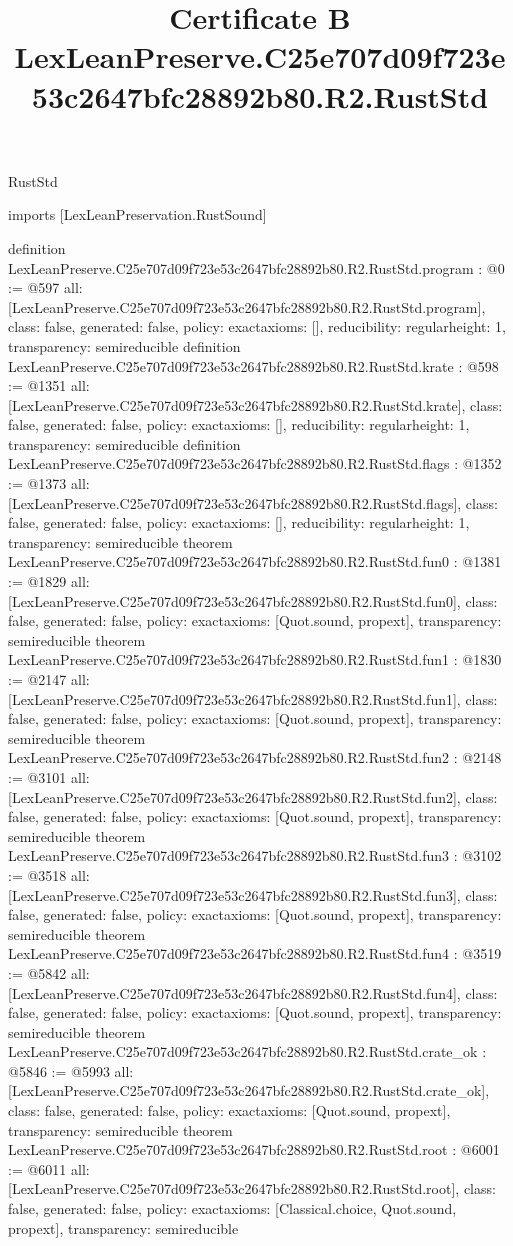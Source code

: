 \begin{lexlean}{RustStd}
\title{Certificate B LexLeanPreserve.C25e707d09f723e53c2647bfc28892b80.R2.RustStd}
\begin{coremodule}
imports [LexLeanPreservation.RustSound]

definition LexLeanPreserve.C25e707d09f723e53c2647bfc28892b80.R2.RustStd.program : @0 := @597 {
  all: [LexLeanPreserve.C25e707d09f723e53c2647bfc28892b80.R2.RustStd.program],
  class: false,
  generated: false,
  policy: exact{axioms: []},
  reducibility: regular{height: 1},
  transparency: semireducible
}
definition LexLeanPreserve.C25e707d09f723e53c2647bfc28892b80.R2.RustStd.krate : @598 := @1351 {
  all: [LexLeanPreserve.C25e707d09f723e53c2647bfc28892b80.R2.RustStd.krate],
  class: false,
  generated: false,
  policy: exact{axioms: []},
  reducibility: regular{height: 1},
  transparency: semireducible
}
definition LexLeanPreserve.C25e707d09f723e53c2647bfc28892b80.R2.RustStd.flags : @1352 := @1373 {
  all: [LexLeanPreserve.C25e707d09f723e53c2647bfc28892b80.R2.RustStd.flags],
  class: false,
  generated: false,
  policy: exact{axioms: []},
  reducibility: regular{height: 1},
  transparency: semireducible
}
theorem LexLeanPreserve.C25e707d09f723e53c2647bfc28892b80.R2.RustStd.fun0 : @1381 := @1829 {
  all: [LexLeanPreserve.C25e707d09f723e53c2647bfc28892b80.R2.RustStd.fun0],
  class: false,
  generated: false,
  policy: exact{axioms: [Quot.sound, propext]},
  transparency: semireducible
}
theorem LexLeanPreserve.C25e707d09f723e53c2647bfc28892b80.R2.RustStd.fun1 : @1830 := @2147 {
  all: [LexLeanPreserve.C25e707d09f723e53c2647bfc28892b80.R2.RustStd.fun1],
  class: false,
  generated: false,
  policy: exact{axioms: [Quot.sound, propext]},
  transparency: semireducible
}
theorem LexLeanPreserve.C25e707d09f723e53c2647bfc28892b80.R2.RustStd.fun2 : @2148 := @3101 {
  all: [LexLeanPreserve.C25e707d09f723e53c2647bfc28892b80.R2.RustStd.fun2],
  class: false,
  generated: false,
  policy: exact{axioms: [Quot.sound, propext]},
  transparency: semireducible
}
theorem LexLeanPreserve.C25e707d09f723e53c2647bfc28892b80.R2.RustStd.fun3 : @3102 := @3518 {
  all: [LexLeanPreserve.C25e707d09f723e53c2647bfc28892b80.R2.RustStd.fun3],
  class: false,
  generated: false,
  policy: exact{axioms: [Quot.sound, propext]},
  transparency: semireducible
}
theorem LexLeanPreserve.C25e707d09f723e53c2647bfc28892b80.R2.RustStd.fun4 : @3519 := @5842 {
  all: [LexLeanPreserve.C25e707d09f723e53c2647bfc28892b80.R2.RustStd.fun4],
  class: false,
  generated: false,
  policy: exact{axioms: [Quot.sound, propext]},
  transparency: semireducible
}
theorem LexLeanPreserve.C25e707d09f723e53c2647bfc28892b80.R2.RustStd.crate_ok : @5846 := @5993 {
  all: [LexLeanPreserve.C25e707d09f723e53c2647bfc28892b80.R2.RustStd.crate_ok],
  class: false,
  generated: false,
  policy: exact{axioms: [Quot.sound, propext]},
  transparency: semireducible
}
theorem LexLeanPreserve.C25e707d09f723e53c2647bfc28892b80.R2.RustStd.root : @6001 := @6011 {
  all: [LexLeanPreserve.C25e707d09f723e53c2647bfc28892b80.R2.RustStd.root],
  class: false,
  generated: false,
  policy: exact{axioms: [Classical.choice, Quot.sound, propext]},
  transparency: semireducible
}


\end{coremodule}
\end{lexlean}
